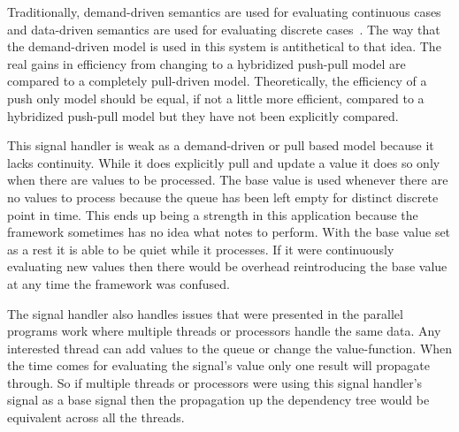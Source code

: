 \documentclass[12pt]{ucthesis}
\begin{document}

Traditionally, demand-driven semantics are used for evaluating continuous cases and data-driven semantics are used for evaluating discrete cases~\cite{push-pull-frp}. The way that the demand-driven model is used in this system is antithetical to that idea. The real gains in efficiency from changing to a hybridized push-pull model are compared to a completely pull-driven model. Theoretically, the efficiency of a push only model should be equal, if not a little more efficient, compared to a hybridized push-pull model but they have not been explicitly compared.  

This signal handler is weak as a demand-driven or pull based model because it lacks continuity. While it does explicitly pull and update a value it does so only when there are values to be processed. The base value is used whenever there are no values to process because the queue has been left empty for distinct discrete point in time. This ends up being a strength in this application because the framework sometimes has no idea what notes to perform. With the base value set as a rest it is able to be quiet while it processes. If it were continuously evaluating new values then there would be overhead reintroducing the base value at any time the framework was confused. 

The signal handler also handles issues that were presented in the parallel programs work where multiple threads or processors handle the same data. Any interested thread can add values to the queue or change the value-function. When the time comes for evaluating the signal's value only one result will propagate through. So if multiple threads or processors were using this signal handler's signal as a base signal then the propagation up the dependency tree would be equivalent across all the threads. 
\end{document}
